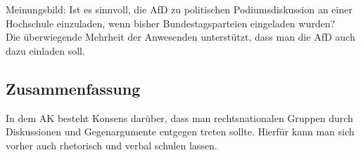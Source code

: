 Meinungsbild: Ist es sinnvoll, die AfD zu politischen Podiumsdiskussion an einer Hochschule einzuladen, wenn bisher Bundestagsparteien eingeladen wurden? \\
Die überwiegende Mehrheit der Anwesenden unterstützt, dass man die AfD auch dazu einladen soll.

  \subsection*{Zusammenfassung}
 In dem AK besteht Konsens darüber, dass man rechtsnationalen Gruppen durch Diskussionen und Gegenargumente entgegen treten sollte. Hierfür kann man sich vorher auch rhetorisch und verbal schulen lassen.
